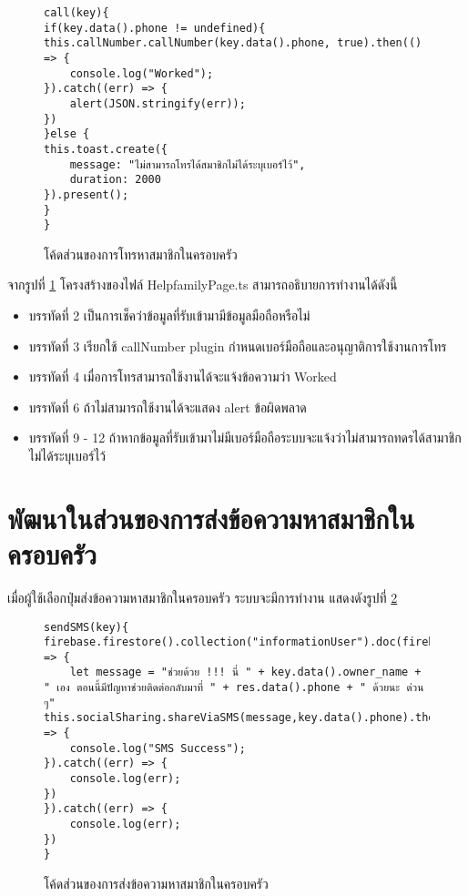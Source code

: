 \begin{figure}[H]
{\lstset{language=Pascal}
\begin{lstlisting}
call(key){
if(key.data().phone != undefined){
this.callNumber.callNumber(key.data().phone, true).then(() => {
	console.log("Worked");
}).catch((err) => {
	alert(JSON.stringify(err));
})
}else {
this.toast.create({
	message: "ไม่สามารถโทรได้สมาชิกไม่ได้ระบุเบอร์ไว้",
	duration: 2000
}).present();
}
}
\end{lstlisting}}
\caption{โค้ดส่วนของการโทรหาสมาชิกในครอบครัว}
\label{Fig:4-call}
\end{figure}

จากรูปที่ \ref{Fig:4-call} โครงสร้างของไฟล์ HelpfamilyPage.ts สามารถอธิบายการทำงานได้ดังนี้
\begin{itemize}[label={--}]
\item บรรทัดที่ 2 เป็นการเช็คว่าข้อมูลที่รับเข้ามามีข้อมูลมือถือหรือไม่
\item บรรทัดที่ 3 เรียกใช้ callNumber plugin กำหนดเบอร์มือถือและอนุญาติการใช้งานการโทร
\item บรรทัดที่ 4 เมื่อการโทรสามารถใช้งานได้จะแจ้งข้อความว่า Worked
\item บรรทัดที่ 6 ถ้าไม่สามารถใช้งานได้จะแสดง alert ข้อผิดพลาด
\item บรรทัดที่ 9 - 12 ถ้าหากข้อมูลที่รับเข้ามาไม่มีเบอร์มือถือระบบจะแจ้งว่าไม่สามารถทดรได้สามาชิกไม่ได้ระบุเบอร์ไว้
\end{itemize}
\newpage


\section{พัฒนาในส่วนของการส่งข้อความหาสมาชิกในครอบครัว}
เมื่อผู้ใช้เลือกปุ่มส่งข้อความหาสมาชิกในครอบครัว ระบบจะมีการทำงาน แสดงดังรูปที่ \ref{Fig:4-sms}

\begin{figure}[H]
{\lstset{language=Pascal}
\begin{lstlisting}
sendSMS(key){
firebase.firestore().collection("informationUser").doc(firebase.auth().currentUser.uid).get().then((res) => {
	let message = "ช่วยด้วย !!! นี่ " + key.data().owner_name + " เอง ตอนนี้มีปัญหาช่วยติดต่อกลับมาที่ " + res.data().phone + " ด้วยนะ ด่วน ๆ"   
this.socialSharing.shareViaSMS(message,key.data().phone).then(() => {
	console.log("SMS Success");
}).catch((err) => {
	console.log(err);
})
}).catch((err) => {
	console.log(err);
})
}
\end{lstlisting}}
\caption{โค้ดส่วนของการส่งข้อความหาสมาชิกในครอบครัว}
\label{Fig:4-sms}
\end{figure}

